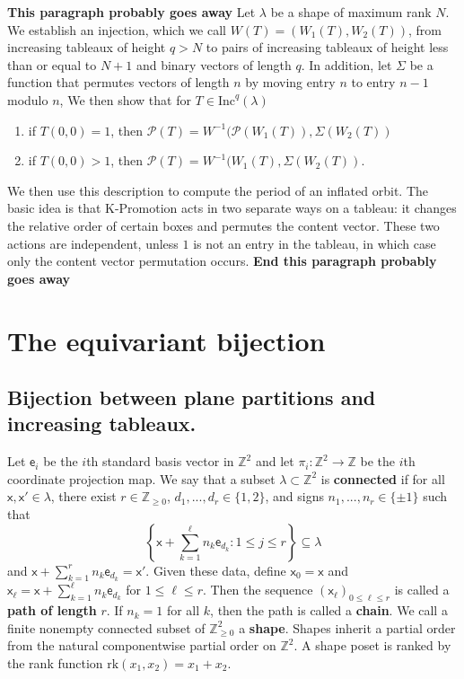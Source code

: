 \documentclass[12pt]{amsart}
\newcommand{\x}{\ensuremath{\mathsf{x}}}
\newcommand{\e}{\ensuremath{\mathsf{e}}}
\theoremstyle{definition}
\theoremstyle{remark}
\numberwithin{equation}{section}
\newcommand{\inc}{\ensuremath{\mathrm{Inc}}}
\newcommand{\pro}{\mathcal{P}}
\begin{document}
\textbf{This paragraph probably goes away}
Let $\lambda$ be a shape of maximum rank $N$. We establish an injection, which we call $W(T) = (W_1(T),W_2(T))$, from increasing tableaux of height $q > N$ to pairs of increasing tableaux of height less than or equal to $N+1$ and binary vectors of length $q$. In addition, let $\Sigma$ be a function that permutes vectors of length $n$ by moving entry $n$ to entry $n-1$ modulo $n$, We then show that for $T \in \inc^q(\lambda)$
\begin{enumerate}
\item if $T(0,0) =1$, then $\pro(T) = W^{-1}(\pro(W_1(T)),\Sigma(W_2(T))$
\item if $T(0,0) > 1$, then $\pro(T) = W^{-1}(W_1(T),\Sigma(W_2(T))$.
\end{enumerate} 
We then use this description to compute the period of an inflated orbit. The basic idea is that K-Promotion acts in two separate ways on a tableau: it changes the relative order of certain boxes and permutes the content vector. These two actions are independent, unless $1$ is not an entry in the tableau, in which case only the content vector permutation occurs. 
\textbf{End this paragraph probably goes away}
\\

\section{The equivariant bijection}\label{sec:equivariant}
\subsection{Bijection between plane partitions and increasing tableaux.} 

Let $\e_i$ be the $i$th standard basis vector in $\mathbb{Z}^{2}$ and let $\pi_i : \mathbb{Z}^{2} \to \mathbb{Z}$ be the $i$th coordinate projection map. We say that a subset $\lambda \subset \mathbb{Z}^{2}$ is {\bf connected} if for all $\x,\x' \in \lambda$, there exist $r \in \mathbb{Z}_{\geq 0}$, $d_1,...,d_r \in \{1, 2 \}$, and signs $n_1,...,n_r \in \{ \pm 1 \}$ such that 
\[\left\{ \x + \sum_{k=1}^\ell n_k \e_{d_k} :  1\leq j \leq r \right\} \subseteq \lambda\]
 and $\x + \sum_{k=1}^r n_k \e_{d_k} = \x'$. Given these data, define $\x_0 = \x$ and $\x_\ell = \x + \sum_{k=1}^\ell n_k \e_{d_k}$ for $1 \leq \ell \leq r$. Then the sequence $\left( \x_\ell  \right)_{0 \leq \ell \leq r}$ is called a {\bf path of length} $r$. If $n_k = 1$ for all $k$, then the path is called a {\bf chain}. We call a finite nonempty connected subset of $\mathbb{Z}_{\geq 0}^2$ a {\bf shape}.  Shapes inherit a partial order from the natural componentwise partial order on $\mathbb{Z}^2$. A shape poset is ranked by the rank function $\text{rk}(x_1,x_2) = x_1 + x_2$.
\end{document}
